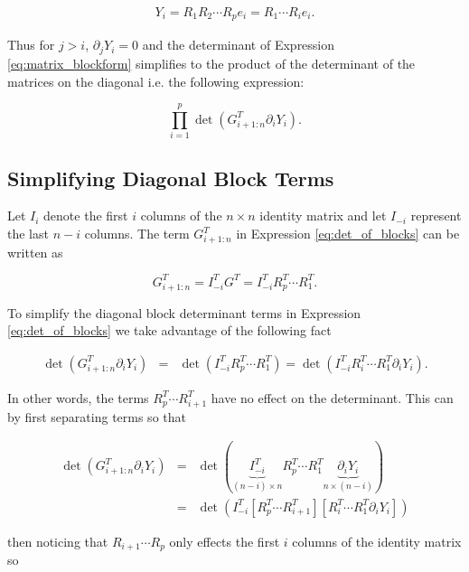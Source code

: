 \documentclass[ba]{imsart}
\numberwithin{equation}{section}
\theoremstyle{plain}
\begin{document}
\begin{eqnarray}
Y_i = R_1 R_2 \cdots R_p e_i = R_1 \cdots R_i e_i.
\end{eqnarray}

\noindent Thus for $j > i$, $\partial_j Y_i = 0$ and the determinant of Expression \ref{eq:matrix_blockform} simplifies to the product of the determinant of the matrices on the diagonal i.e. the following expression:

\begin{equation}
\label{eq:det_of_blocks}
\prod_{i=1}^p \det \left( G_{i+1:n}^T \partial_{i} Y_i \right).
\end{equation}

\subsection{Simplifying Diagonal Block Terms}
Let $I_{i}$ denote the first $i$ columns of the $n \times n$ identity matrix and let $I_{-i}$ represent the last $n-i$ columns. The term $G_{i+1:n}^T$ in Expression \ref{eq:det_of_blocks} can be written as

\begin{equation}
G_{i+1:n}^T = I_{-i}^T G^T = I_{-i}^T R_p^T \cdots R_1^T.
\end{equation}

\noindent To simplify the diagonal block determinant terms in Expression \ref{eq:det_of_blocks} we take advantage of the following fact

\begin{eqnarray}
\det \left( G_{i+1:n}^T \partial_i Y_i  \right)  &=& \det \left( I_{-i}^T R_p^T \cdots R_1^T \right) =  \det\left( I_{-i}^T R_i^T \cdots R_1^T \partial_i Y_i \right).
\end{eqnarray}

\noindent In other words, the terms $R_p^T \cdots R_{i+1}^T$ have no effect on the determinant. This can by first separating terms so that

\begin{eqnarray}
\det\left(G_{i+1:n}^T \partial_{i} Y_i \right) &=& \det\left( \underbrace{I_{-i}^T}_{(n-i) \times n} R_p^T \cdots R_1^T \underbrace{\partial_i Y_i}_{n \times (n-i)} \right)\\
&=& \det\left(
I_{-i}^T
\left[ R_p^T \cdots R_{i+1}^T\right] \left[ R_i^T \cdots R_1^T \partial_i Y_i \right] \right)
\end{eqnarray}

\noindent then noticing that $R_{i+1} \cdots R_p$ only effects the first $i$ columns of the identity matrix so 
\end{document}
